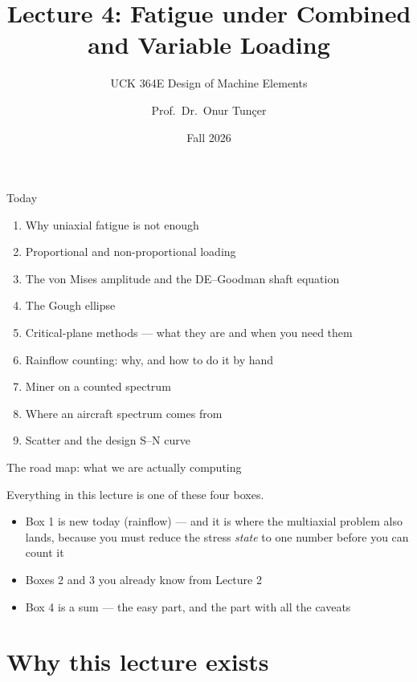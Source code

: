 \documentclass[aspectratio=169,10pt]{beamer}
\title{Lecture 4: Fatigue under Combined and Variable Loading}
\subtitle{UCK 364E Design of Machine Elements}
\author{Prof.\ Dr.\ Onur Tunçer}
\institute{Department of Aeronautical Engineering, Istanbul Technical University}
\date{Fall 2026}
\begin{document}
\maketitle

\begin{frame}{Today}
\begin{enumerate}
  \item Why uniaxial fatigue is not enough
  \item Proportional and non-proportional loading
  \item The von Mises amplitude and the DE--Goodman shaft equation
  \item The Gough ellipse
  \item Critical-plane methods --- what they are and when you need them
  \item Rainflow counting: why, and how to do it by hand
  \item Miner on a counted spectrum
  \item Where an aircraft spectrum comes from
  \item Scatter and the design S--N curve
\end{enumerate}
\end{frame}


\begin{frame}{The road map: what we are actually computing}
\centering

\vspace{6pt}

\raggedright
Everything in this lecture is one of these four boxes.
\begin{itemize}\footnotesize
  \item \alert{Box 1} is new today (rainflow) --- and it is where the multiaxial problem also lands, because you must reduce the stress \emph{state} to one number before you can count it
  \item \alert{Boxes 2 and 3} you already know from Lecture 2
  \item \alert{Box 4} is a sum --- the easy part, and the part with all the caveats
\end{itemize}
\end{frame}

\section{Why this lecture exists}
\end{document}
